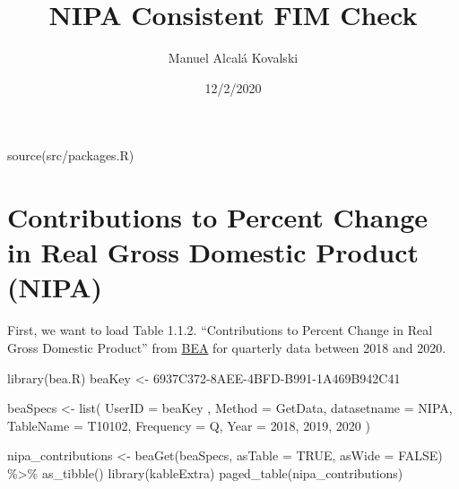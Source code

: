 \documentclass[
]{article}
\title{NIPA Consistent FIM Check}
\author{Manuel Alcalá Kovalski}
\date{12/2/2020}
\newenvironment{Shaded}{\begin{snugshade}}{\end{snugshade}}
\newcommand{\AttributeTok}[1]{\textcolor[rgb]{0.77,0.63,0.00}{#1}}
\newcommand{\ConstantTok}[1]{\textcolor[rgb]{0.00,0.00,0.00}{#1}}
\newcommand{\FunctionTok}[1]{\textcolor[rgb]{0.00,0.00,0.00}{#1}}
\newcommand{\NormalTok}[1]{#1}
\newcommand{\OtherTok}[1]{\textcolor[rgb]{0.56,0.35,0.01}{#1}}
\newcommand{\SpecialCharTok}[1]{\textcolor[rgb]{0.00,0.00,0.00}{#1}}
\newcommand{\StringTok}[1]{\textcolor[rgb]{0.31,0.60,0.02}{#1}}
\begin{document}
\maketitle

\begin{Shaded}
\begin{Highlighting}[]
\FunctionTok{source}\NormalTok{(}\StringTok{\textquotesingle{}src/packages.R\textquotesingle{}}\NormalTok{)}
\end{Highlighting}
\end{Shaded}

\hypertarget{contributions-to-percent-change-in-real-gross-domestic-product-nipa}{%
\section{Contributions to Percent Change in Real Gross Domestic Product
(NIPA)}\label{contributions-to-percent-change-in-real-gross-domestic-product-nipa}}

First, we want to load Table 1.1.2. ``Contributions to Percent Change in
Real Gross Domestic Product'' from
\href{https://apps.bea.gov/iTable/iTable.cfm?reqid=19\&step=3\&isuri=1\&nipa_table_list=2\&categories=survey}{BEA}
for quarterly data between 2018 and 2020.

\begin{Shaded}
\begin{Highlighting}[]
\FunctionTok{library}\NormalTok{(bea.R)}
\NormalTok{beaKey }\OtherTok{\textless{}{-}} \StringTok{\textquotesingle{}6937C372{-}8AEE{-}4BFD{-}B991{-}1A469B942C41\textquotesingle{}}

\NormalTok{beaSpecs }\OtherTok{\textless{}{-}} \FunctionTok{list}\NormalTok{(}
    \StringTok{\textquotesingle{}UserID\textquotesingle{}} \OtherTok{=}\NormalTok{ beaKey ,}
    \StringTok{\textquotesingle{}Method\textquotesingle{}} \OtherTok{=} \StringTok{\textquotesingle{}GetData\textquotesingle{}}\NormalTok{,}
    \StringTok{\textquotesingle{}datasetname\textquotesingle{}} \OtherTok{=} \StringTok{\textquotesingle{}NIPA\textquotesingle{}}\NormalTok{,}
    \StringTok{\textquotesingle{}TableName\textquotesingle{}} \OtherTok{=} \StringTok{\textquotesingle{}T10102\textquotesingle{}}\NormalTok{,}
    \StringTok{\textquotesingle{}Frequency\textquotesingle{}} \OtherTok{=} \StringTok{\textquotesingle{}Q\textquotesingle{}}\NormalTok{,}
    \StringTok{\textquotesingle{}Year\textquotesingle{}} \OtherTok{=} \StringTok{\textquotesingle{}2018, 2019, 2020\textquotesingle{}}
\NormalTok{)}

\NormalTok{nipa\_contributions }\OtherTok{\textless{}{-}}
  \FunctionTok{beaGet}\NormalTok{(beaSpecs,  }\AttributeTok{asTable =} \ConstantTok{TRUE}\NormalTok{, }\AttributeTok{asWide =} \ConstantTok{FALSE}\NormalTok{) }\SpecialCharTok{\%\textgreater{}\%} 
  \FunctionTok{as\_tibble}\NormalTok{()}
\FunctionTok{library}\NormalTok{(kableExtra)}
\FunctionTok{paged\_table}\NormalTok{(nipa\_contributions)}
\end{Highlighting}
\end{Shaded}
\end{document}
